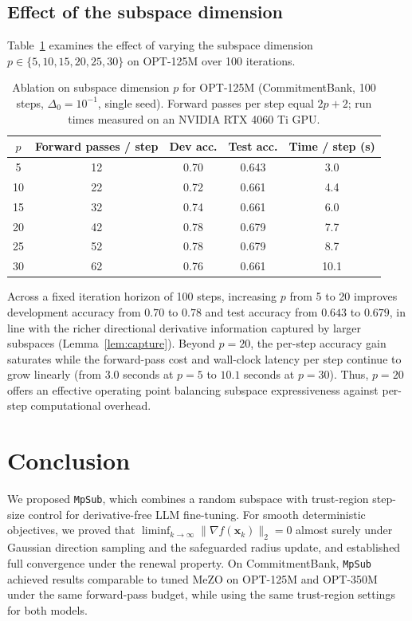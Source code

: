 \documentclass{siamart171218}
\newcommand{\bx}{\bm{x}}
\begin{document}
\subsection{Effect of the subspace dimension}
\label{subsec:p_ablation}

Table~\ref{tab:p_ablation} examines the effect of varying the subspace dimension $p \in \{5, 10, 15, 20, 25, 30\}$ on OPT-125M over 100 iterations.

\begin{table}[htb]
\centering
\caption{Ablation on subspace dimension $p$ for OPT-125M (CommitmentBank, 100 steps, $\Delta_0 = 10^{-1}$, single seed). Forward passes per step equal $2p+2$; run times measured on an NVIDIA RTX 4060 Ti GPU.}
\label{tab:p_ablation}
\small
\begin{tabular}{ccccc}
\toprule
$p$ & Forward passes / step & Dev acc. & Test acc. & Time / step (s) \\
\midrule
5  & 12 & 0.70 & 0.643 & 3.0 \\
10 & 22 & 0.72 & 0.661 & 4.4 \\
15 & 32 & 0.74 & 0.661 & 6.0 \\
20 & 42 & 0.78 & 0.679 & 7.7 \\
25 & 52 & 0.78 & 0.679 & 8.7 \\
30 & 62 & 0.76 & 0.661 & 10.1 \\
\bottomrule
\end{tabular}
\end{table}

Across a fixed iteration horizon of 100 steps, increasing $p$ from 5 to 20 improves development accuracy from $0.70$ to $0.78$ and test accuracy from $0.643$ to $0.679$, in line with the richer directional derivative information captured by larger subspaces (Lemma~\ref{lem:capture}). Beyond $p = 20$, the per-step accuracy gain saturates while the forward-pass cost and wall-clock latency per step continue to grow linearly (from $3.0$ seconds at $p = 5$ to $10.1$ seconds at $p = 30$). Thus, $p = 20$ offers an effective operating point balancing subspace expressiveness against per-step computational overhead.

\section{Conclusion}
\label{sec:conclusion}

We proposed \texttt{MpSub}, which combines a random subspace with trust-region step-size control for derivative-free LLM fine-tuning. For smooth deterministic objectives, we proved that $\liminf_{k\to\infty} \|\nabla f(\bx_k)\|_2 = 0$ almost surely under Gaussian direction sampling and the safeguarded radius update, and established full convergence under the renewal property. On CommitmentBank, \texttt{MpSub} achieved results comparable to tuned MeZO on OPT-125M and OPT-350M under the same forward-pass budget, while using the same trust-region settings for both models.
\end{document}
